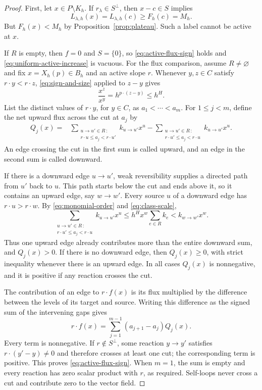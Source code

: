 \begin{proof}
First, let $x\in P\setminus K_h$.  If $r_\lambda\in S^\perp$,
then $x-c\in S$ implies
\[
 L_{\lambda,h}(x)=L_{\lambda,h}(c)\geq F_h(c)=M_h.
\]
But $F_h(x)<M_h$ by Proposition~\ref{prop:plateau}.  Such a label
cannot be active at $x$.

If $R$ is empty, then $f=0$ and $S=\{0\}$, so
\eqref{eq:active-flux-sign} holds and
\eqref{eq:uniform-active-increase} is vacuous.  For the flux comparison,
assume $R\ne\varnothing$ and fix $x=X_h(p)\in B_h$ and an active slope $r$.
Whenever $y,z\in C$ satisfy $r\cdot y<r\cdot z$,
\eqref{eq:sign-and-size} applied to $z-y$ gives
\begin{equation}\label{eq:monomial-order}
 \frac{x^z}{x^y}=h^{p\cdot(z-y)}\leq h^H.
\end{equation}
List the distinct values of $r\cdot y$, for $y\in C$, as
$a_1<\cdots<a_m$.  For $1\leq j<m$, define the net upward flux across
the cut at $a_j$ by
\begin{align*}
 Q_j(x)={}&
 \sum_{\substack{u\to u'\in R\,:\\r\cdot u\leq a_j<r\cdot u'}}
       k_{u\to u'}x^u
 -\sum_{\substack{u\to u'\in R\,:\\r\cdot u'\leq a_j<r\cdot u}}
       k_{u\to u'}x^u.
\end{align*}
An edge crossing the cut in the first sum is called upward, and an
edge in the second sum is called downward.

If there is a downward edge $u\to u'$, weak reversibility supplies a
directed path from $u'$ back to $u$.  This path starts below the cut
and ends above it, so it contains an upward edge, say $w\to w'$.
Every source $u$ of a downward edge has $r\cdot u>r\cdot w$.
By \eqref{eq:monomial-order} and \eqref{eq:class-scale},
\[
 \sum_{\substack{u\to u'\in R\,:\\r\cdot u'\leq a_j<r\cdot u}}
       k_{u\to u'}x^u
 \leq h^H x^w\sum_{e\in R}k_e
 < k_{w\to w'}x^w.
\]
Thus one upward edge already contributes more than the entire
downward sum, and $Q_j(x)>0$.  If there is no downward edge, then
$Q_j(x)\geq0$, with strict inequality whenever there is an upward
edge.  In all cases $Q_j(x)$ is nonnegative, and it is positive if
any reaction crosses the cut.

The contribution of an edge to $r\cdot f(x)$ is its flux multiplied
by the difference between the levels of its target and source.
Writing this difference as the signed sum of the intervening gaps gives
\begin{equation}\label{eq:cut-flux-decomposition}
 r\cdot f(x)=\sum_{j=1}^{m-1}(a_{j+1}-a_j)Q_j(x).
\end{equation}
Every term is nonnegative.  If $r\notin S^\perp$, some reaction
$y\to y'$ satisfies $r\cdot(y'-y)\ne0$ and therefore crosses at least
one cut; the corresponding term is positive.  This proves
\eqref{eq:active-flux-sign}.  When $m=1$, the sum is empty and every
reaction has zero scalar product with $r$, as required.  Self-loops
never cross a cut and contribute zero to the vector field.


\end{proof}
